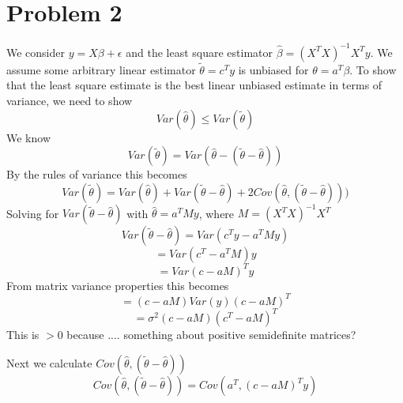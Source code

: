 \section*{Problem 2}
We consider $y=X\beta + \epsilon$ and the least square estimator $\hat{\beta} = (X^TX)^{-1}X^Ty$. We assume some arbitrary linear estimator $\tilde{\theta} = c^Ty$ is unbiased for $\theta = a^T\beta$. To show that the least square estimate is the best linear unbiased estimate in terms of variance, we need to show
\[ Var(\hat{\theta}) \leq  Var(\tilde{\theta}) \]
We know 
\[ Var(\tilde{\theta}) = Var(\hat{\theta} - (\tilde{\theta} - \hat{\theta})) \]
By the rules of variance this becomes
\[ Var(\tilde{\theta}) = Var(\hat{\theta}) + Var(\tilde{\theta} - \hat{\theta}) + 2Cov(\hat{\theta},(\tilde{\theta} - \hat{\theta}))) \]
Solving for $Var(\tilde{\theta} - \hat{\theta})$ with $\hat{\theta} = a^TMy$, where $M = (X^TX)^{-1}X^T$ 
\[ Var(\tilde{\theta} - \hat{\theta}) = Var(c^Ty - a^TMy) \]
\[  = Var(c^T - a^TM)y \]
\[  = Var(c - aM)^Ty \]
From matrix variance properties this becomes
\[  = (c - aM)Var(y)(c - aM)^T \]
\[  = \sigma^2(c - aM)(c^T - aM)^T \]
This is $> 0$ because .... something about positive semidefinite matrices?\newline

\noindent Next we calculate $Cov(\hat{\theta},(\tilde{\theta} - \hat{\theta}))$
\[ Cov(\hat{\theta},(\tilde{\theta} - \hat{\theta})) = Cov(a^T,(c-aM)^Ty)  \]
